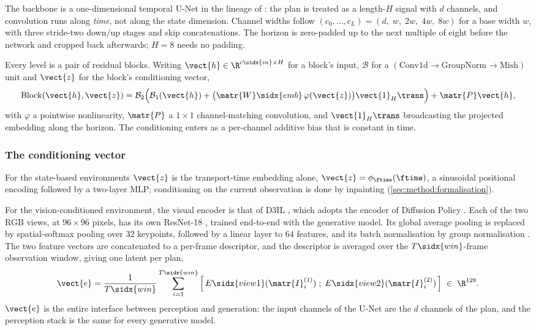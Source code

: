 The backbone is a one-dimensional temporal U-Net in the lineage of
\parencite{janner2022planning}: the plan is treated as a length-$H$ signal with $d$ channels,
and convolution runs along \emph{time}, not along the state dimension. Channel widths follow
$\left(c_{0},\dots,c_{L}\right) = \left(d,\;w,\;2w,\;4w,\;8w\right)$ for a base width $w$, with
three stride-two down/up stages and skip concatenations. The horizon is zero-padded up to the next
multiple of eight before the network and cropped back afterwards; $H = 8$ needs no padding.

Every level is a pair of residual blocks. Writing $\vect{h}\in\R^{c\sidx{in}\times H}$ for a block's
input, $\mathcal{B}$ for a $\left(\text{Conv1d}\to\text{GroupNorm}\to\text{Mish}\right)$ unit and
$\vect{z}$ for the block's conditioning vector,
\begin{equation}\label{eq:method:backbone:block}
  \operatorname{Block}(\vect{h},\vect{z})
  = \mathcal{B}_{2}\Big(\mathcal{B}_{1}(\vect{h}) + \big(\matr{W}\sidx{emb}\,\varphi(\vect{z})\big)\vect{1}_{H}\trans\Big)
    + \matr{P}\vect{h},
\end{equation}
with $\varphi$ a pointwise nonlinearity, $\matr{P}$ a $1\times1$ channel-matching convolution, and
$\vect{1}_{H}\trans$ broadcasting the projected embedding along the horizon. The conditioning
enters as a per-channel additive bias that is constant in time.

\subsubsection*{The conditioning vector}

For the state-based environments $\vect{z}$ is the transport-time embedding alone,
$\vect{z} = \phi_{\ftime}(\ftime)$, a sinusoidal positional encoding followed by a two-layer MLP;
conditioning on the current observation is done by inpainting
(\autoref{sec:method:formalisation}).

For the vision-conditioned environment, the visual encoder is that of D3IL \parencite{jia2024towards},
which adopts the encoder of Diffusion Policy \parencite[Sec.~3.2]{chi2023diffusion}. Each of the two
RGB views, at $96\times96$ pixels, has its own ResNet-18 \parencite{he2016deep}, trained end-to-end
with the generative model. Its global average pooling is replaced by spatial-softmax pooling
\parencite{mandlekar2021matters} over $32$ keypoints, followed by a linear layer to $64$ features, and
its batch normalisation by group normalisation \parencite{wu2018group}. The two feature vectors are
concatenated to a per-frame descriptor, and the descriptor is averaged over the
$T\sidx{win}$-frame observation window, giving one latent per plan,
\begin{equation}\label{eq:method:backbone:latent}
  \vect{e}
  = \frac{1}{T\sidx{win}}\sum_{i=1}^{T\sidx{win}}
    \Big[\,E\sidx{view1}(\matr{I}^{(1)}_{i})\;;\;E\sidx{view2}(\matr{I}^{(2)}_{i})\,\Big]
  \;\in\;\R^{128}.
\end{equation}
$\vect{e}$ is the entire interface between perception and generation: the input channels of the
U-Net are the $d$ channels of the plan, and the perception stack is the same for every generative
model.

